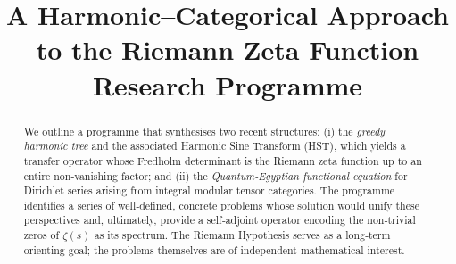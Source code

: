 \documentclass[11pt,a4paper]{article}
\title{\bfseries A Harmonic–Categorical Approach to the Riemann Zeta Function\\
\large Research Programme}
\author{}
\date{}
\begin{document}
\maketitle

\begin{abstract}
We outline a programme that synthesises two recent structures: (i) the \emph{greedy harmonic tree} and the associated Harmonic Sine Transform (HST), which yields a transfer operator whose Fredholm determinant is the Riemann zeta function up to an entire non‑vanishing factor; and (ii) the \emph{Quantum‑Egyptian functional equation} for Dirichlet series arising from integral modular tensor categories. The programme identifies a series of well‑defined, concrete problems whose solution would unify these perspectives and, ultimately, provide a self‑adjoint operator encoding the non‑trivial zeros of \(\zeta(s)\) as its spectrum. The Riemann Hypothesis serves as a long‑term orienting goal; the problems themselves are of independent mathematical interest.
\end{abstract}
\end{document}
